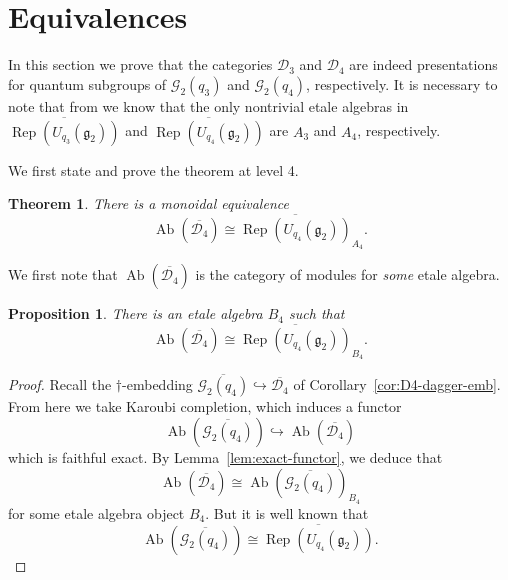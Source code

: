 \documentclass[pdflatex,sn-mathphys-num]{sn-jnl}%
\theoremstyle{thmstyleone}%
\newtheorem{proposition}{Proposition}
\newtheorem{theorem}{Theorem}
\theoremstyle{thmstyletwo}%
\theoremstyle{thmstylethree}%
\newcommand{\DD}{\mathcal{D}}
\newcommand{\GG}{\mathcal{G}}
\newcommand{\ol}{\overline}
\renewcommand{\gg}{\mathfrak{g}}
\DeclareMathOperator{\Rep}{Rep}
\DeclareMathOperator{\Ab}{Ab}
\begin{document}






\section{Equivalences}\label{sec:equivalences}

In this section we prove that the categories $\DD_3$ and $\DD_4$ are indeed
presentations for quantum subgroups of $\GG_2(q_3)$ and $\GG_2(q_4)$, respectively.
It is necessary to note that from \cite{gannon_exotic_q_subgroups_extensions-II} we know that 
the only nontrivial etale algebras in $\ol{\Rep(U_{q_3}(\gg_2))}$ and 
$\ol{\Rep(U_{q_4}(\gg_2))}$ are $A_3$ and $A_4$, respectively.

We first state and prove the theorem at level 4.

\begin{theorem}\label{thm:level-4}
    There is a monoidal equivalence
    \[
        \Ab(\ol{\DD_4}) \cong \ol{ \Rep(U_{q_4}(\gg_2))}_{A_4}.
    \]
\end{theorem}

We first note that $\Ab(\ol{\DD_4})$ is the category of modules for {\it some} etale algebra.

\begin{proposition}
    There is an etale algebra $B_4$ such that 
    \[
        \Ab(\ol{\DD_4}) \cong \ol{ \Rep(U_{q_4}(\gg_2))}_{B_4}.
    \]
\end{proposition}

\begin{proof}
    Recall the $\dagger$-embedding $\ol{\GG_2(q_4)} \hookrightarrow \ol{\DD_4}$ of Corollary~\ref{cor:D4-dagger-emb}.
    From here we take Karoubi completion, which induces a functor 
    \[
        \Ab( \ol{\GG_2(q_4)} ) \hookrightarrow \Ab( \ol{\DD_4} )
    \]
    which is faithful exact.
    By Lemma~\ref{lem:exact-functor}, we deduce that
    \[
        \Ab(\ol{\DD_4}) \cong \Ab( \ol{\GG_2(q_4)} )_{B_4}
    \]
    for some etale algebra object $B_4$.
    But it is well known \cite{Kuperberg} that 
    \[
        \Ab( \ol{\GG_2(q_4)} ) \cong \ol{ \Rep(U_{q_4}(\gg_2))}.
    \]
\end{proof}
\end{document}

